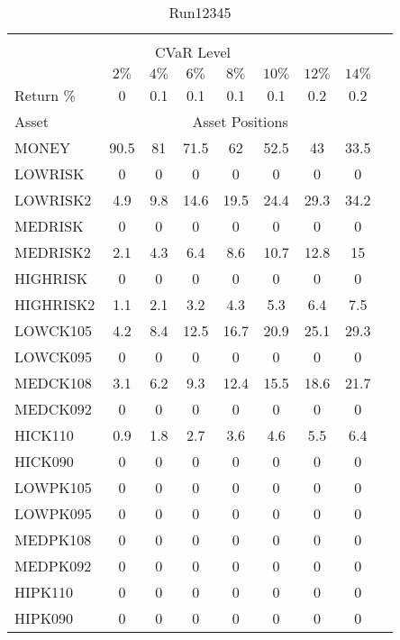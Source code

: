 \begin{table}[h!t]
\caption{Run12345}
\centering
\begin{tabular}[t]{ l c c c c c c c c }
\hline\hline \\
\multicolumn{8}{c}{CVaR Level} \\
 & $2\%$ & $4\%$ & $6\%$ & $8\%$ & $10\%$ & $12\%$ & $14\%$ \\[0.5ex]
Return \% &0 &0.1 &0.1 &0.1 &0.1 &0.2 &0.2\\[0.5ex]
Asset & \multicolumn{7}{c}{Asset Positions} \\[1ex]
MONEY & 90.5 & 81 & 71.5 & 62 & 52.5 & 43 & 33.5\\
LOWRISK & 0 & 0 & 0 & 0 & 0 & 0 & 0\\
LOWRISK2 & 4.9 & 9.8 & 14.6 & 19.5 & 24.4 & 29.3 & 34.2\\
MEDRISK & 0 & 0 & 0 & 0 & 0 & 0 & 0\\
MEDRISK2 & 2.1 & 4.3 & 6.4 & 8.6 & 10.7 & 12.8 & 15\\
HIGHRISK & 0 & 0 & 0 & 0 & 0 & 0 & 0\\
HIGHRISK2 & 1.1 & 2.1 & 3.2 & 4.3 & 5.3 & 6.4 & 7.5\\
LOWCK105 & 4.2 & 8.4 & 12.5 & 16.7 & 20.9 & 25.1 & 29.3\\
LOWCK095 & 0 & 0 & 0 & 0 & 0 & 0 & 0\\
MEDCK108 & 3.1 & 6.2 & 9.3 & 12.4 & 15.5 & 18.6 & 21.7\\
MEDCK092 & 0 & 0 & 0 & 0 & 0 & 0 & 0\\
HICK110 & 0.9 & 1.8 & 2.7 & 3.6 & 4.6 & 5.5 & 6.4\\
HICK090 & 0 & 0 & 0 & 0 & 0 & 0 & 0\\
LOWPK105 & 0 & 0 & 0 & 0 & 0 & 0 & 0\\
LOWPK095 & 0 & 0 & 0 & 0 & 0 & 0 & 0\\
MEDPK108 & 0 & 0 & 0 & 0 & 0 & 0 & 0\\
MEDPK092 & 0 & 0 & 0 & 0 & 0 & 0 & 0\\
HIPK110 & 0 & 0 & 0 & 0 & 0 & 0 & 0\\
HIPK090 & 0 & 0 & 0 & 0 & 0 & 0 & 0\\
[1ex] \hline
\end{tabular}
\end{table} 